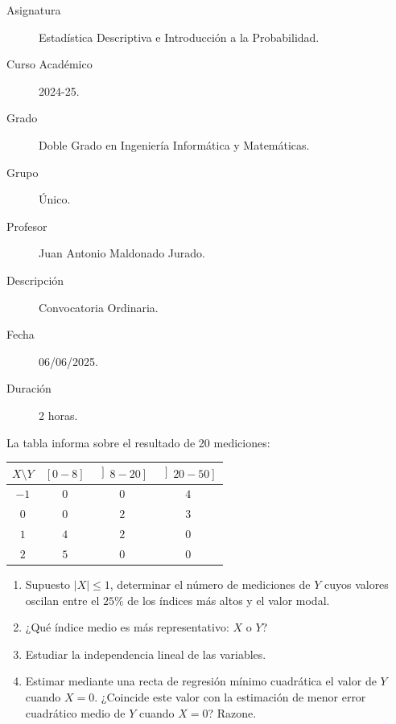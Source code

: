 \documentclass[12pt]{article}
\begin{document}

    
    

    \begin{description}
         \item[Asignatura] Estadística Descriptiva e Introducción a la Probabilidad.
        \item[Curso Académico] 2024-25.
        \item[Grado] Doble Grado en Ingeniería Informática y Matemáticas.
        \item[Grupo] Único.
        \item[Profesor] Juan Antonio Maldonado Jurado.
        \item[Descripción] Convocatoria Ordinaria.
        \item[Fecha] 06/06/2025.
        \item[Duración] 2 horas.
    \end{description}

    \newpage


    
    \begin{ejercicio}
        La tabla informa sobre el resultado de 20 mediciones:
        \begin{center}
        \renewcommand{\arraystretch}{1.2}
        \begin{tabular}{c|ccc}
            $X \setminus Y$ & $[0-8]$ & $\left]8-20\right]$ & $\left]20-50\right]$ \\ \hline
            $-1$ & $0$ & $0$ & $4$ \\
            $0$  & $0$ & $2$ & $3$ \\
            $1$  & $4$ & $2$ & $0$ \\
            $2$  & $5$ & $0$ & $0$
        \end{tabular}
        \end{center}

        \begin{enumerate}[label=\alph*)]
            \item Supuesto $|X| \leq 1$, determinar el número de mediciones de $Y$ cuyos valores oscilan entre el $25\%$ de los índices más altos y el valor modal.
            \item ¿Qué índice medio es más representativo: $X$ o $Y$?
            \item Estudiar la independencia lineal de las variables.
            \item Estimar mediante una recta de regresión mínimo cuadrática el valor de $Y$ cuando $X=0$. ¿Coincide este valor con la estimación de menor error cuadrático medio de $Y$ cuando $X=0$? Razone.
        \end{enumerate}
    \end{ejercicio}
\end{document}
